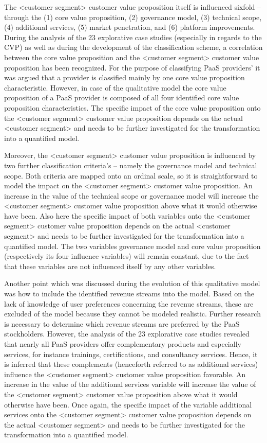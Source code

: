 The <customer segment> customer value proposition itself is influenced sixfold -- through the (1) core value proposition, (2) governance model, (3) technical scope, (4) additional services, (5) market penetration, and (6) platform improvements. During the analysis of the 23 explorative case studies (especially in regards to the \ac{CVP}) as well as during the development of the classification scheme, a correlation between the core value proposition and the <customer segment> customer value proposition has been recognized. For the purpose of classifying \ac{PaaS} providers' it was argued that a provider is classified mainly by one core value proposition characteristic. However, in case of the qualitative model the core value proposition of a \ac{PaaS} provider is composed of all four identified core value proposition characteristics. The specific impact of the core value proposition onto the <customer segment> customer value proposition depends on the actual <customer segment> and needs to be further investigated for the transformation into a quantified model.

Moreover, the <customer segment> customer value proposition is influenced by two further classification criteria's -- namely the governance model and technical scope. Both criteria are mapped onto an ordinal scale, so it is straightforward to model the impact on the <customer segment> customer value proposition. An increase in the value of the technical scope or governance model will increase the <customer segment> customer value proposition above what it would otherwise have been. Also here the specific impact of both variables onto the <customer segment> customer value proposition depends on the actual <customer segment> and needs to be further investigated for the transformation into a quantified model. The two variables governance model and core value proposition (respectively its four influence variables) will remain constant, due to the fact that these variables are not influenced itself by any other variables.

Another point which was discussed during the 	evolution of this qualitative model was how to include the identified revenue streams into the model. Based on the lack of knowledge of user preferences concerning the revenue streams, these are excluded of the model because they cannot be modeled realistic. Further research is necessary to determine which revenue streams are preferred by the \ac{PaaS} stockholders. However, the analysis of the 23 explorative case studies revealed that nearly all \ac{PaaS} providers offer complementary products and especially services, for instance trainings, certifications, and consultancy services. Hence, it is inferred that these complements (henceforth referred to as additional services) influence the <customer segment> customer value proposition favorable. An increase in the value of the additional services variable will increase the value of the <customer segment> customer value proposition above what it would otherwise have been. Once again, the specific impact of the variable additional services onto the <customer segment> customer value proposition depends on the actual <customer segment> and needs to be further investigated for the transformation into a quantified model.

